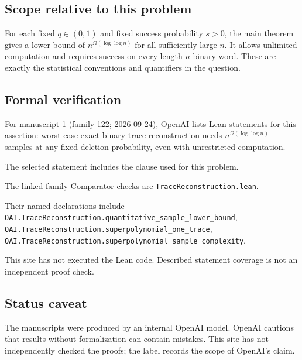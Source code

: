 \documentclass[11pt]{article}
\begin{document}
\subsection{Scope relative to this problem}
For each fixed $q\in(0,1)$ and fixed success probability $s>0$, the main theorem gives a lower bound of $n^{\Omega(\log\log n)}$ for all sufficiently large $n$. It allows unlimited computation and requires success on every length-$n$ binary word. These are exactly the statistical conventions and quantifiers in the question.

\subsection{Formal verification}
For manuscript 1 (family 122; 2026-09-24), OpenAI lists Lean statements for this assertion: worst-case exact binary trace reconstruction needs $n^{\Omega(\log\log n)}$ samples at any fixed deletion probability, even with unrestricted computation.

The selected statement includes the clause used for this problem.

The linked family Comparator checks are \texttt{TraceReconstruction.lean}.

Their named declarations include \texttt{OAI.TraceReconstruction.quantitative\_sample\_lower\_bound}, \texttt{OAI.TraceReconstruction.superpolynomial\_one\_trace}, \texttt{OAI.TraceReconstruction.superpolynomial\_sample\_complexity}.

This site has not executed the Lean code. Described statement coverage is not an independent proof check.

\subsection{Status caveat}
The manuscripts were produced by an internal OpenAI model. OpenAI cautions that results without formalization can contain mistakes. This site has not independently checked the proofs; the label records the scope of OpenAI's claim.
\end{document}
